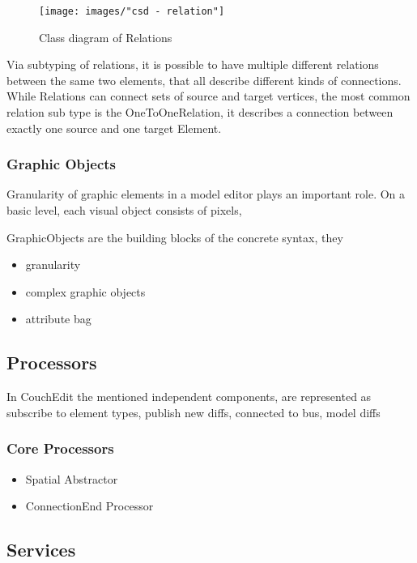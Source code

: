 \begin{figure}[h]
  \centering
  \texttt{[image: images/"csd - relation"]}
  \caption{Class diagram of Relations}
  \label{fig:relations}
\end{figure}

Via subtyping of relations, it is possible to have multiple different relations between the same two elements, that all describe different kinds of connections. While Relations can connect sets of source and target vertices, the most common relation sub type is the OneToOneRelation, it describes a connection between exactly one source and one target Element. 


\subsubsection{Graphic Objects}
Granularity of graphic elements in a model editor plays an important role. On a basic level, each visual object consists of pixels, 


GraphicObjects are the building blocks of the concrete syntax, they 

\begin{itemize}
  \item granularity 
  \item complex graphic objects
  \item attribute bag
\end{itemize}


\subsection{Processors}
In CouchEdit the mentioned independent components, are represented as 
subscribe to element types, publish new diffs, connected to bus, model diffs

\subsubsection{Core Processors}
\begin{itemize}
  \item Spatial Abstractor 
  \item ConnectionEnd Processor
\end{itemize}

\subsection{Services}



